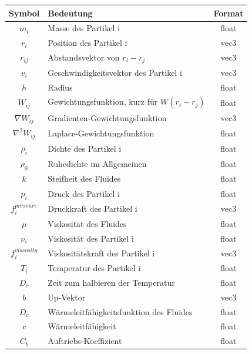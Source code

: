\documentclass[intern,palatino]{cgBA}
\begin{document}
\begin{figure}[H]
	\centering
		\begin{tabular}{ | c | p{8cm} | c |}
			\hline
			Symbol & Bedeutung & Format  \\ \hline
			$m_i $ 				&  Masse des Partikel i								&	float	\\ \hline
			$r_i $		 		&  Position des Partikel i							&	vec3	\\ \hline
			$r_{ij}$ 			&  Abstandsvektor von $r_i - r_j$					&	vec3	\\ \hline
			$v_i$	 			&  Geschwindigkeitsvektor des Partikel i			&	vec3	\\ \hline
			$h $ 				&  Radius											&	float	\\ \hline
			$W_{ij} $ 			&  Gewichtungsfunktion, kurz für $W (r_i - r_j)$	&	float	\\ \hline
			$\nabla W_{ij} $ 	&  Gradienten-Gewichtungsfunktion					&	vec3	\\ \hline
			$\nabla^2 W_{ij} $ 	&  Laplace-Gewichtungsfunktion						&	float	\\ \hline
			$\rho_i $ 			&  Dichte des Partikel i		 					&	float	\\ \hline
			$\rho_0 $ 			&  Ruhedichte im Allgemeinen						&	float	\\ \hline
			$k $ 				&  Steifheit des Fluides							&	float	\\ \hline
			$p_i $ 				&  Druck des Partikel i								&	float	\\ \hline
			$f^{pressure}_i $	&  Druckkraft des Partikel i						&	vec3	\\ \hline
			$\mu $ 				&  Viskosität des Fluides							&	float	\\ \hline
			$\nu_i $ 			&  Viskosität des Partikel i						&	float	\\ \hline
			$f^{viscosity}_i $ 	&  Viskositätskraft des Partikel i					&	vec3	\\ \hline
			$T_i $ 				&  Temperatur des Partikel i						&	float	\\ \hline
			$D_r $ 				&  Zeit zum halbieren der Temperatur				&	float	\\ \hline
			$b $ 				&  Up-Vektor										&	vec3	\\ \hline
			$D_c $ 				&  Wärmeleitfähigkeitsfunktion des Fluides			&	float	\\ \hline
			$c $ 				&  Wärmeleitfähigkeit								&	float	\\ \hline
			$C_b $ 				&  Auftriebs-Koeffizient							&	float	\\ \hline

\end{tabular}
\end{figure}
\end{document}
